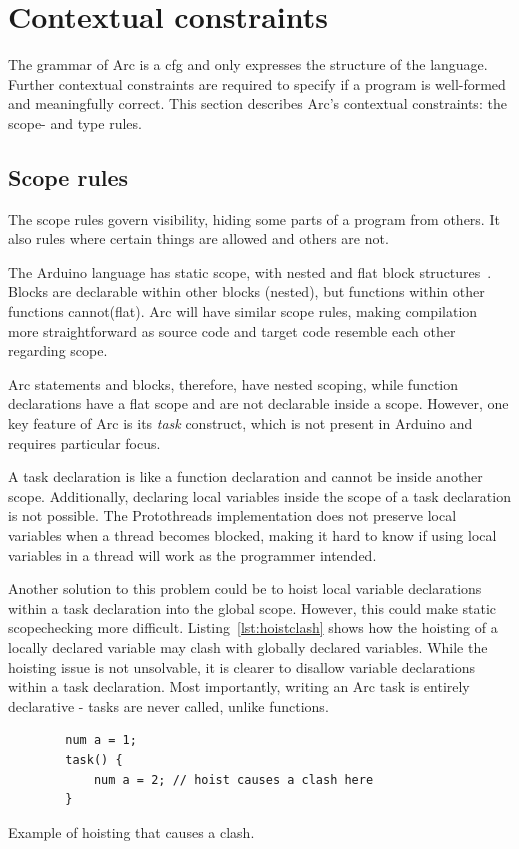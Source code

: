 \section{Contextual constraints}
The grammar of Arc is a \gls{cfg} and only expresses the structure of the language. Further contextual constraints are required to specify if a program is well-formed and meaningfully correct. This section describes Arc's contextual constraints: the scope- and type rules.

\subsection{Scope rules}\label{subsec:scoperules}
The scope rules govern visibility, hiding some parts of a program from others. It also rules where certain things are allowed and others are not.

The Arduino language has static scope, with nested and flat block structures~\cite{cppref}. Blocks are declarable within other blocks (nested), but functions within other functions cannot(flat). Arc will have similar scope rules, making compilation more straightforward as source code and target code resemble each other regarding scope.

Arc statements and blocks, therefore, have nested scoping, while function declarations have a flat scope and are not declarable inside a scope. However, one key feature of Arc is its \textit{task} construct, which is not present in Arduino and requires particular focus.

A task declaration is like a function declaration and cannot be inside another scope. Additionally, declaring local variables inside the scope of a task declaration is not possible. The Protothreads implementation does not preserve local variables when a thread becomes blocked, making it hard to know if using local variables in a thread will work as the programmer intended.

Another solution to this problem could be to hoist local variable declarations within a task declaration into the global scope. However, this could make static scopechecking more difficult. Listing~\ref{lst:hoistclash} shows how the hoisting of a locally declared variable may clash with globally declared variables. While the hoisting issue is not unsolvable, it is clearer to disallow variable declarations within a task declaration. Most importantly, writing an Arc task is entirely declarative - tasks are never called, unlike functions.


\begin{listing}[htb!]
    \begin{verbatim}
        num a = 1;
        task() {
            num a = 2; // hoist causes a clash here
        }
    \end{verbatim}
    \caption{Example of hoisting that causes a clash.}
    \label{lst:hoistclash}
\end{listing}


